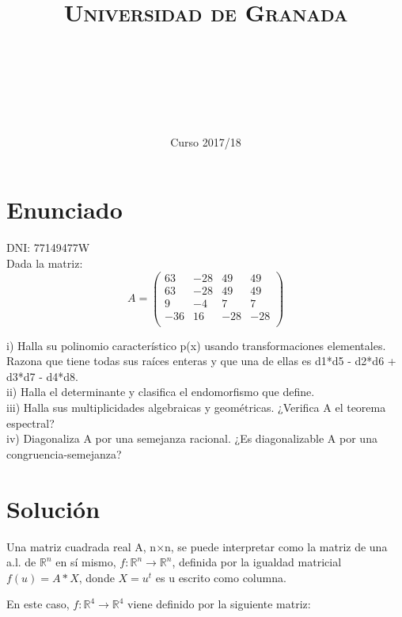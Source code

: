 \documentclass[11pt, a4paper]{article}
\title{
  \normalfont \normalsize 
  \textsc{Universidad de Granada} \\ [25pt]    %
  \horrule{0.5pt} \\[0.4cm] %
  \huge \sffamily\subject\\ %
  \horrule{2pt} \\[0.5cm] %
}
\author{\Large\sffamily{\docauthor}}
\date{\vspace{-1.5em} \normalsize \sffamily Curso 2017/18}
\newif\IfInSansMode
\newcommand{\R}{\mathbb{R}} \newcommand{\N}{\mathbb{N}}
\theoremstyle{theorem-style}
\theoremstyle{definition-style}
\theoremstyle{remark-style}
\theoremstyle{example-style}
\begin{document}
\maketitle  %
\vfill
\begin{center}
\end{center}
\newpage
\tableofcontents    %
\newpage



\section{Enunciado}
DNI: 77149477W \\
Dada la matriz:
$$A = \begin{pmatrix}
	63 & -28 & 49 & 49\\
	63 & -28 & 49 & 49\\
	9 & -4 & 7 & 7\\
	-36 & 16 & -28 & -28 \\
\end{pmatrix}$$
	
i) Halla su polinomio característico p(x) usando transformaciones elementales. Razona que tiene todas sus raíces enteras y que una de ellas es d1*d5 - d2*d6 +
d3*d7 - d4*d8.\\
ii) Halla el determinante y clasifica el endomorfismo que define.\\
iii) Halla sus multiplicidades algebraicas y geométricas. ¿Verifica A el teorema espectral?\\
iv) Diagonaliza A por una semejanza racional. ¿Es diagonalizable A por una congruencia-semejanza?\\

\section{Solución}

Una matriz cuadrada real A, n×n, se puede interpretar como la matriz de una a.l. de $\R^n$ en sí mismo, $f: \R^n \to \R^n$, definida por la igualdad matricial $f(u)=A*X$, donde $X=u^{t}$ es u escrito como columna.

En este caso, $f: \R^4 \to \R^4$ viene definido por la siguiente matriz:
\end{document}
